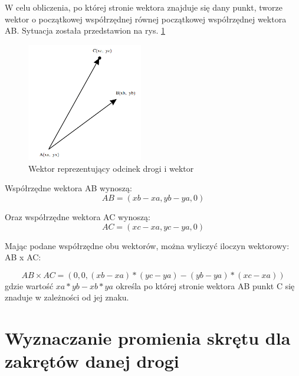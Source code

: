 W celu obliczenia, po której stronie wektora znajduje się dany punkt, tworze wektor o początkowej współrzędnej równej początkowej współrzędnej wektora AB. Sytuacja została przedstawion na rys. \ref{sec:VectorVector}


\begin{figure}[h]
\caption{Wektor reprezentujący odcinek drogi i wektor}
\label{sec:VectorVector}
\centering
\includegraphics[width=0.45\textwidth]{vectorVector}
\end{figure}

Współrzędne wektora AB wynoszą:
\begin{equation}
AB = (xb - xa, yb - ya, 0)
\end{equation}


Oraz współrzędne wektora AC wynoszą:
\begin{equation}
AC = (xc - xa, yc - ya, 0)
\end{equation}

Mając podane współrzędne obu wektorów, można wyliczyć iloczyn wektorowy: AB x AC:

\begin{equation}
AB \times AC = (0, 0, (xb - xa) * (yc - ya) - (yb - ya) * (xc - xa))
\end{equation}
gdzie wartość $xa * yb - xb * ya$ określa po której stronie wektora AB punkt C się znaduje w zależności od jej znaku. 

\newpage
\section{Wyznaczanie promienia skrętu dla zakrętów danej drogi}
\label{sec:WyznaczaniePromieniaSkrętuDlaZakrętówDanejDrogi}

